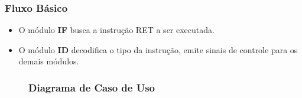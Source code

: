 \subsubsection*{Fluxo Básico}
\begin{itemize}
	\item O módulo \textbf{IF} busca a instrução RET a ser executada.
	\item O módulo \textbf{ID} decodifica o tipo da instrução, emite sinais de controle para os demais módulos.
\end{itemize}

\begin{figure}[htpb!]
	\subsubsection*{Diagrama de Caso de Uso}
	
\end{figure}
